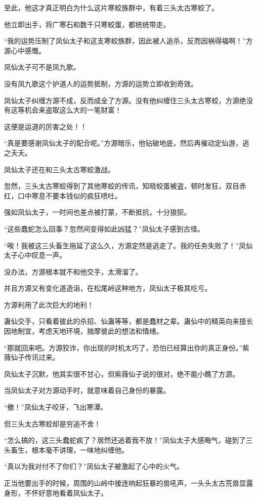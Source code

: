 \begin{this_body}
至此，他这才真正明白为什么这片寒蛟族群中，有着三头太古寒蛟了。

他立即出手，将广寒石和数千只寒蛟蛋，都统统带走。

“我的运势压制了凤仙太子和这支寒蛟族群，因此被人追杀，反而因祸得福啊！”方源心中感慨。

凤仙太子可不是凤九歌。

没有凤九歌这个护道人的运势抵制，方源的运势立即收到奇效。

凤仙太子纠缠方源不成，反而成全了方源。没有他纠缠住三头太古寒蛟，方源绝没有这等机会来盗取这么大的一笔财富！

这便是运道的厉害之处！！

“真是要感谢凤仙太子的配合呢。”方源暗乐，他钻破地底，然后再催动定仙游，逃之夭夭。

凤仙太子还在和三头太古寒蛟激战。

忽然，三头太古寒蛟得到了其他寒蛟的传讯，知晓蛟蛋被盗，顿时发狂，双目赤红，口中寒息不要本钱似的疯狂喷吐。

强如凤仙太子，一时间也差点被打蒙，不断抵抗，十分狼狈。

“这些蠢蛇怎么回事？忽然间变得如此凶猛？”凤仙太子感到古怪。

“唉！我被这三头畜生拖延了这么久，方源定然是逃走了。我的任务失败了！”凤仙太子心中叹息一声。

没办法，方源根本就不和他交手，太滑溜了。

并且方源又有变化道造诣，在松尾岭这种地方，凤仙太子极其吃亏。

方源利用了此次巨大的地利！

蛊仙交手，只看着彼此的杀招、仙蛊等等，都是蠢材之辈。蛊仙中的精英向来擅长因地制宜，考虑天地环境，揣摩彼此的想法和情绪。

“那就回来吧。方源狡诈，你出现的时机太巧了，恐怕已经算出你的真正身份。”紫薇仙子传讯过来。

凤仙太子沉默，他其实很不甘心，但紫薇仙子说的很对，绝不能小瞧了方源。

当凤仙太子对方源动手时，就意味着自己身份的暴露。

“撤！”凤仙太子咬牙，飞出寒潭。

但三头太古寒蛟却是穷追不舍！

“怎么搞的，这三头蠢蛇疯了？居然还追着我不放！”凤仙太子大感晦气，碰到了三头畜生，根本毫不讲理，一味地纠缠他。

“真以为我对付不了你们？”凤仙太子被激起了心中的火气。

正当他要出手的时候，周围的山岭中接连响起狂暴的兽吼声，一头头太古荒兽显露身形，不怀好意地看着凤仙太子。


\end{this_body}
